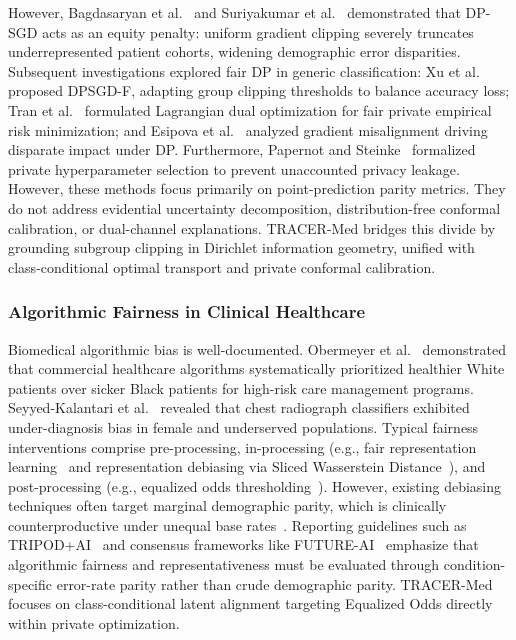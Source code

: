 \documentclass[pdflatex,sn-vancouver-num,referee,lineno]{sn-jnl}
\theoremstyle{thmstyleone}
\theoremstyle{thmstylethree}
\begin{document}
However, Bagdasaryan et al.~\cite{bagdasaryan2019differential} and Suriyakumar et al.~\cite{suriyakumar2021chasing} demonstrated that DP-SGD acts as an equity penalty: uniform gradient clipping severely truncates underrepresented patient cohorts, widening demographic error disparities. Subsequent investigations explored fair DP in generic classification: Xu et al.~\cite{xu2021removing} proposed DPSGD-F, adapting group clipping thresholds to balance accuracy loss; Tran et al.~\cite{tran2021differentially} formulated Lagrangian dual optimization for fair private empirical risk minimization; and Esipova et al.~\cite{esipova2022gradient} analyzed gradient misalignment driving disparate impact under DP. Furthermore, Papernot and Steinke~\cite{papernot2022hyperparameter} formalized private hyperparameter selection to prevent unaccounted privacy leakage. However, these methods focus primarily on point-prediction parity metrics. They do not address evidential uncertainty decomposition, distribution-free conformal calibration, or dual-channel explanations. TRACER-Med bridges this divide by grounding subgroup clipping in Dirichlet information geometry, unified with class-conditional optimal transport and private conformal calibration.

\subsubsection{Algorithmic Fairness in Clinical Healthcare}
Biomedical algorithmic bias is well-documented. Obermeyer et al.~\cite{obermeyer2019dissecting} demonstrated that commercial healthcare algorithms systematically prioritized healthier White patients over sicker Black patients for high-risk care management programs. Seyyed-Kalantari et al.~\cite{seyyed2021underdiagnosis} revealed that chest radiograph classifiers exhibited under-diagnosis bias in female and underserved populations. Typical fairness interventions comprise pre-processing, in-processing (e.g., fair representation learning~\cite{zemel2013learning} and representation debiasing via Sliced Wasserstein Distance~\cite{bonneel2015sliced,rabin2012wasserstein,kolouri2019generalized}), and post-processing (e.g., equalized odds thresholding~\cite{hardt2016equality}). However, existing debiasing techniques often target marginal demographic parity, which is clinically counterproductive under unequal base rates~\cite{barocas2019fairness,chouldechova2017fair,kleinberg2016inherent}. Reporting guidelines such as TRIPOD+AI~\cite{tripodai2024} and consensus frameworks like FUTURE-AI~\cite{futureai2023} emphasize that algorithmic fairness and representativeness must be evaluated through condition-specific error-rate parity rather than crude demographic parity. TRACER-Med focuses on class-conditional latent alignment targeting Equalized Odds directly within private optimization.
\end{document}
